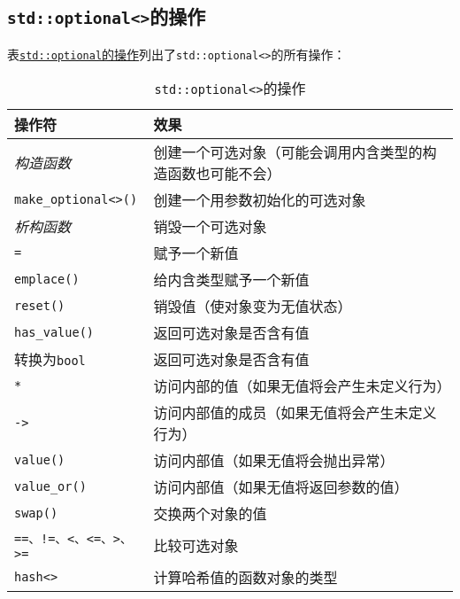 \subsection{\texttt{std::optional<>}的操作}
表\hyperref[t15.1]{\texttt{std::optional}的操作}列出了\texttt{std::optional<>}的所有操作：
\begin{table}[ht]
    \begin{tabular}{l|p{}}
        \hline
        \textbf{操作符}                & \textbf{效果}                   \\
        \hline
        \emph{构造函数}                 & 创建一个可选对象（可能会调用内含类型的构造函数也可能不会） \\
        \texttt{make\_optional<>()} & 创建一个用参数初始化的可选对象               \\
        \emph{析构函数}                 & 销毁一个可选对象                      \\
        \texttt{=}                  & 赋予一个新值                        \\
        \texttt{emplace()}          & 给内含类型赋予一个新值                   \\
        \texttt{reset()}            & 销毁值（使对象变为无值状态）                \\
        \texttt{has\_value()}       & 返回可选对象是否含有值                   \\
        转换为\texttt{bool}            & 返回可选对象是否含有值                   \\
        \texttt{*}                  & 访问内部的值（如果无值将会产生未定义行为）         \\
        \texttt{->}                 & 访问内部值的成员（如果无值将会产生未定义行为）       \\
        \texttt{value()}            & 访问内部值（如果无值将会抛出异常）             \\
        \texttt{value\_or()}        & 访问内部值（如果无值将返回参数的值）            \\
        \texttt{swap()}             & 交换两个对象的值                      \\
        \texttt{==、!=、<、<=、>、>=}    & 比较可选对象                        \\
        \texttt{hash<>}             & 计算哈希值的函数对象的类型                 \\
        \hline
    \end{tabular}
    \caption{\texttt{std::optional<>}的操作}
    \label{t15.1}
\end{table}

